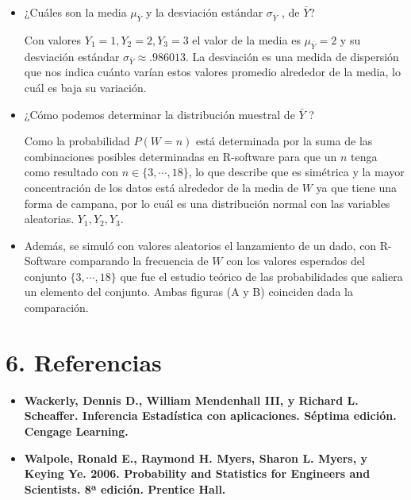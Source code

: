\documentclass[
]{article}
\begin{document}
\begin{itemize}
  
  \item ¿Cuáles son la media $\mu_{\bar{Y}}$ y la desviación estándar $\sigma_{\bar{Y}}$ , de $\bar{Y}$?
  
  Con valores $Y_{1}=1,Y_{2}=2, Y_{3}=3$ el valor de la media es $\mu_{\bar{Y}} = 2$ y su desviación estándar $\sigma_{\bar{Y}} \approx .986013 $. La desviación es una medida de dispersión que nos indica cuánto varían estos valores promedio alrededor de la media, lo cuál es baja su variación.

  \item ¿Cómo podemos determinar la
distribución muestral de $\bar{Y}$ ?

Como la probabilidad $\displaystyle P(W=n)$ está determinada por la suma de las combinaciones posibles determinadas en R-software para que un $n$ tenga como resultado con $n \in \{3, \cdots, 18 \}$, lo que describe que es simétrica y la mayor concentración de los datos está alrededor de la media de $W$ ya que tiene una forma de campana, por lo cuál es una distribución normal con las variables aleatorias. $Y_{1},Y_{2},Y_{3}$. 

  \item Además, se simuló con valores aleatorios el lanzamiento de un dado, con R-Software comparando la frecuencia de $W$ con los valores esperados del conjunto $\{3,\cdots,18\}$ que fue el estudio teórico de las probabilidades que saliera un elemento del conjunto. Ambas figuras (A y B) coinciden dada la comparación.
\end{itemize}

\hypertarget{referencias}{%
\section{6. Referencias}\label{referencias}}

\begin{itemize}

  \item \textbf{Wackerly, Dennis D., William Mendenhall III, y Richard L. Scheaffer. Inferencia Estadística con aplicaciones. Séptima edición. Cengage Learning.}
  
  \item \textbf{Walpole, Ronald E., Raymond H. Myers, Sharon L. Myers, y Keying Ye. 2006. Probability and Statistics for Engineers and Scientists. 8ª edición. Prentice Hall.}

\end{itemize}
\end{document}
